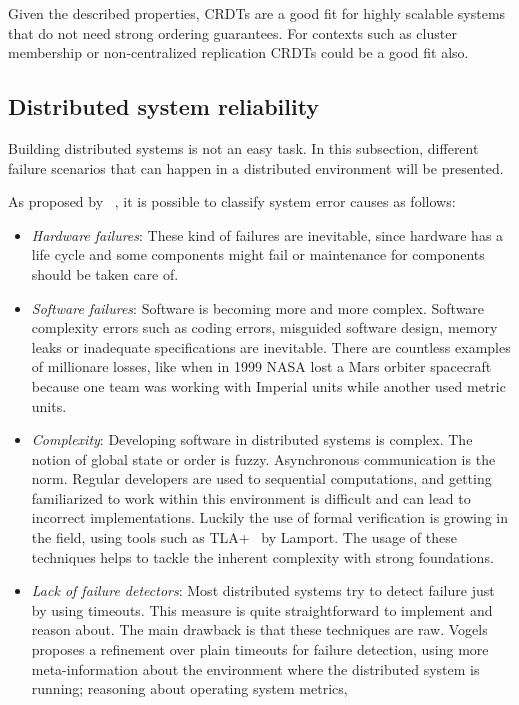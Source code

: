 Given the described properties, \acs{CRDT}s are a good fit for highly scalable
systems that do not need strong ordering guarantees. For contexts such as
cluster membership or non-centralized replication \acs{CRDT}s could be a good
fit also.

\subsection{Distributed system reliability}

Building distributed systems is not an easy task. In this subsection, different
failure scenarios that can happen in a distributed environment will be presented.

As proposed by ~\cite{GuideReliable}, it is possible to classify system error
causes as follows:
\begin{itemize}
\item \textit{Hardware failures}: These kind of failures are inevitable, since
  hardware has a life cycle and some components might fail or maintenance for
  components should be taken care of.
\item \textit{Software failures}: Software is becoming more and more complex.
  Software complexity errors such as coding errors, misguided software design,
  memory leaks or inadequate specifications are inevitable. There are countless
  examples of millionare losses, like when in 1999 NASA lost a Mars orbiter
  spacecraft because one team was working with Imperial units while another used
  metric units.
\item \textit{Complexity}: Developing software in distributed systems is
  complex. The notion of global state or order is fuzzy. Asynchronous
  communication is the norm. Regular developers are used to sequential
  computations, and getting familiarized to work within this environment is difficult
  and can lead to incorrect implementations. Luckily the use of formal verification
  is growing in the field, using tools such as TLA+~\cite{tla} by Lamport. The
  usage of these techniques helps to tackle the inherent complexity with strong
  foundations.
\item \textit{Lack of failure detectors}: Most distributed systems try to detect
  failure just by using timeouts. This measure is quite straightforward to
  implement and reason about. The main drawback is that these techniques are
  raw. Vogels ~\cite{vogels} proposes a refinement over plain timeouts for
  failure detection, using more meta-information about the environment where
  the distributed system is running; reasoning about operating system metrics,

\end{itemize}
